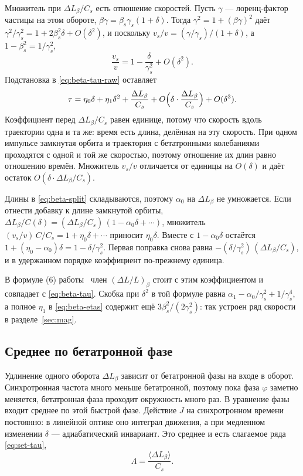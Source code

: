 Множитель при $\Delta L_\beta/C_s$ есть отношение скоростей. Пусть $\gamma$ --- лоренц-фактор частицы на этом обороте, $\beta\gamma=\beta_s\gamma_s(1+\delta)$. Тогда $\gamma^2=1+(\beta\gamma)^2$ даёт $\gamma^2/\gamma_s^2=1+2\beta_s^2\delta+O(\delta^2)$, и поскольку $v_s/v=(\gamma/\gamma_s)/(1+\delta)$, а $1-\beta_s^2=1/\gamma_s^2$,
\begin{equation}
\label{eq:beta-v}
\frac{v_s}{v}=1-\frac{\delta}{\gamma_s^2}+O(\delta^2).
\end{equation}
Подстановка в \eqref{eq:beta-tau-raw} оставляет
\begin{equation}
\label{eq:beta-tau}
\tau
=\eta_0\delta+\eta_1\delta^2+\frac{\Delta L_\beta}{C_s}
+O\Bigl(\delta\cdot\frac{\Delta L_\beta}{C_s}\Bigr)+O(\delta^3).
\end{equation}
Коэффициент перед $\Delta L_\beta/C_s$ равен единице, потому что скорость вдоль траектории одна и та же: время есть длина, делённая на эту скорость. При одном импульсе замкнутая орбита и траектория с бетатронными колебаниями проходятся с одной и той же скоростью, поэтому отношение их длин равно отношению времён. Множитель $v_s/v$ отличается от единицы на $O(\delta)$ и даёт остаток $O(\delta\cdot\Delta L_\beta/C_s)$.

Длины в \eqref{eq:beta-split} складываются, поэтому $\alpha_0$ на $\Delta L_\beta$ не умножается. Если отнести добавку к длине замкнутой орбиты, $\Delta L_\beta/C(\delta)=(\Delta L_\beta/C_s)\,(1-\alpha_0\delta+\cdots)$, множитель $(v_s/v)\,C/C_s=1+\eta_0\delta+\cdots$ приносит $\eta_0\delta$. Вместе с $1-\alpha_0\delta$ остаётся $1+(\eta_0-\alpha_0)\delta=1-\delta/\gamma_s^2$. Первая поправка снова равна $-(\delta/\gamma_s^2)\,(\Delta L_\beta/C_s)$, и в удержанном порядке коэффициент по-прежнему единица.

В формуле (6) работы~\cite{Senichev2013} член $(\Delta L/L)_\beta$ стоит с этим коэффициентом и совпадает с \eqref{eq:beta-tau}. Скобка при $\delta^2$ в той формуле равна $\alpha_1-\alpha_0/\gamma_s^2+1/\gamma_s^4$, а полное $\eta_1$ в \eqref{eq:beta-etas} содержит ещё $3\beta_s^2/(2\gamma_s^2)$: так устроен ряд скорости в разделе~\ref{sec:mag}.

\subsection{Среднее по бетатронной фазе}
\label{sec:beta-avg}

Удлинение одного оборота $\Delta L_\beta$ зависит от бетатронной фазы на входе в оборот. Синхротронная частота много меньше бетатронной, поэтому пока фаза $\varphi$ заметно меняется, бетатронная фаза проходит окружность много раз. В уравнение фазы входит среднее по этой быстрой фазе. Действие $J$ на синхротронном времени постоянно: в линейной оптике оно интеграл движения, а при медленном изменении $\delta$ --- адиабатический инвариант. Это среднее и есть слагаемое ряда \eqref{eq:set-tau},
\begin{equation}
\label{eq:beta-Lambda-def}
\Lambda=\frac{\langle\Delta L_\beta\rangle}{C_s}.
\end{equation}

